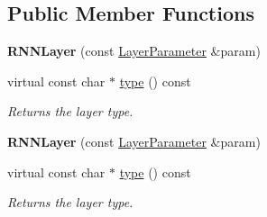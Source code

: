 \subsection*{Public Member Functions}
\begin{DoxyCompactItemize}
\item 
\mbox{\label{classcaffe_1_1_r_n_n_layer_a2290c3f1738679a6196b86102ed08558}} 
{\bfseries R\+N\+N\+Layer} (const \mbox{\hyperlink{classcaffe_1_1_layer_parameter}{Layer\+Parameter}} \&param)
\item 
\mbox{\label{classcaffe_1_1_r_n_n_layer_a4c0d018f595c6627de34555dc0fc553c}} 
virtual const char $\ast$ \mbox{\hyperlink{classcaffe_1_1_r_n_n_layer_a4c0d018f595c6627de34555dc0fc553c}{type}} () const
\begin{DoxyCompactList}\small\item\em Returns the layer type. \end{DoxyCompactList}\item 
\mbox{\label{classcaffe_1_1_r_n_n_layer_a2290c3f1738679a6196b86102ed08558}} 
{\bfseries R\+N\+N\+Layer} (const \mbox{\hyperlink{classcaffe_1_1_layer_parameter}{Layer\+Parameter}} \&param)
\item 
\mbox{\label{classcaffe_1_1_r_n_n_layer_a4c0d018f595c6627de34555dc0fc553c}} 
virtual const char $\ast$ \mbox{\hyperlink{classcaffe_1_1_r_n_n_layer_a4c0d018f595c6627de34555dc0fc553c}{type}} () const
\begin{DoxyCompactList}\small\item\em Returns the layer type. \end{DoxyCompactList}\end{DoxyCompactItemize}
